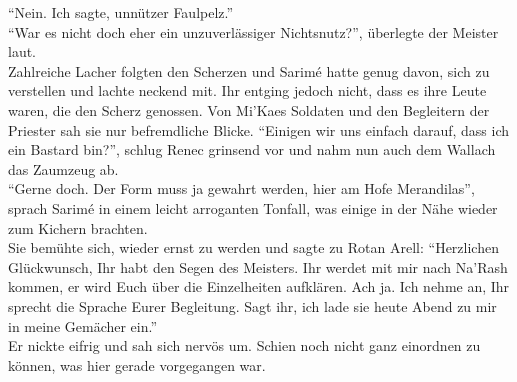 ``Nein. Ich sagte, unnützer Faulpelz.''\\
``War es nicht doch eher ein unzuverlässiger Nichtsnutz?'', überlegte der Meister laut.\\
Zahlreiche Lacher folgten den Scherzen und Sarimé hatte genug davon, sich zu verstellen und lachte 
neckend mit. Ihr entging jedoch nicht, dass es ihre Leute waren, die den Scherz genossen. Von 
Mi'Kaes Soldaten und den Begleitern der Priester sah sie nur befremdliche Blicke. ``Einigen wir uns 
einfach darauf, dass ich ein Bastard bin?'', schlug Renec grinsend vor und nahm nun auch dem Wallach 
das Zaumzeug ab.\\
``Gerne doch. Der Form muss ja gewahrt werden, hier am Hofe Merandilas'', sprach Sarimé in einem 
leicht arroganten Tonfall, was einige in der Nähe wieder zum Kichern brachten.\\
Sie bemühte sich, wieder ernst zu werden und sagte zu Rotan Arell: ``Herzlichen Glückwunsch, Ihr 
habt den Segen des Meisters. Ihr werdet mit mir nach Na'Rash kommen, er wird Euch über die 
Einzelheiten aufklären. Ach ja. Ich nehme an, Ihr sprecht die Sprache Eurer Begleitung. Sagt ihr, 
ich lade sie heute Abend zu mir in meine Gemächer ein.''\\
Er nickte eifrig und sah sich nervös um. Schien noch nicht ganz einordnen zu können, was hier 
gerade vorgegangen war.\\

